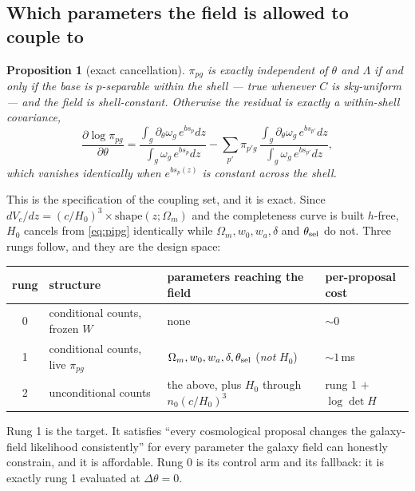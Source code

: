 \documentclass[11pt]{article}
\newtheorem{proposition}{Proposition}
\theoremstyle{definition}
\theoremstyle{remark}
\begin{document}
\subsection{Which parameters the field is allowed to couple to}
\label{sec:cancel}

\begin{proposition}[exact cancellation]
\label{prop:cancel}
$\pi_{pg}$ is exactly independent of $\theta$ and $\Lambda$ if and only if the base
is $p$-separable within the shell --- true whenever $C$ is sky-uniform --- and the
field is shell-constant. Otherwise the residual is exactly a within-shell
covariance,
\begin{equation}
  \frac{\partial\log\pi_{pg}}{\partial\theta}
  =\frac{\int_g\partial_\theta\omega_g\,e^{bs_p}dz}{\int_g\omega_g\,e^{bs_p}dz}
  -\sum_{p'}\pi_{p'g}\,
  \frac{\int_g\partial_\theta\omega_g\,e^{bs_{p'}}dz}{\int_g\omega_g\,e^{bs_{p'}}dz},
  \label{eq:cancelresidual}
\end{equation}
which vanishes identically when $e^{bs_p(z)}$ is constant across the shell.
\end{proposition}

\noindent This is the specification of the coupling set, and it is exact. Since
$dV_c/dz=(c/H_0)^3\times\text{shape}(z;\Omega_m)$ and the completeness curve is
built $h$-free, $H_0$ cancels from \eqref{eq:pipg} identically while
$\Omega_m,w_0,w_a,\delta$ and $\theta_{\rm sel}$ do not. Three rungs follow, and they
are the design space:

\begin{center}\small
\begin{tabular}{clll}
\toprule
rung & structure & parameters reaching the field & per-proposal cost \\
\midrule
0 & conditional counts, frozen $W$ & none & $\sim0$ \\
1 & conditional counts, live $\pi_{pg}$ & $\Omega_m,w_0,w_a,\delta,\theta_{\rm sel}$ (\emph{not} $H_0$) & $\sim1$\,ms \\
2 & unconditional counts & the above, plus $H_0$ through $n_0(c/H_0)^3$ & rung 1 $+$ $\log\det H$ \\
\bottomrule
\end{tabular}
\end{center}

\noindent Rung 1 is the target. It satisfies ``every cosmological proposal changes
the galaxy-field likelihood consistently'' for every parameter the galaxy field can
honestly constrain, and it is affordable. Rung 0 is its control arm and its
fallback: it is exactly rung 1 evaluated at $\Delta\theta=0$.
\end{document}
